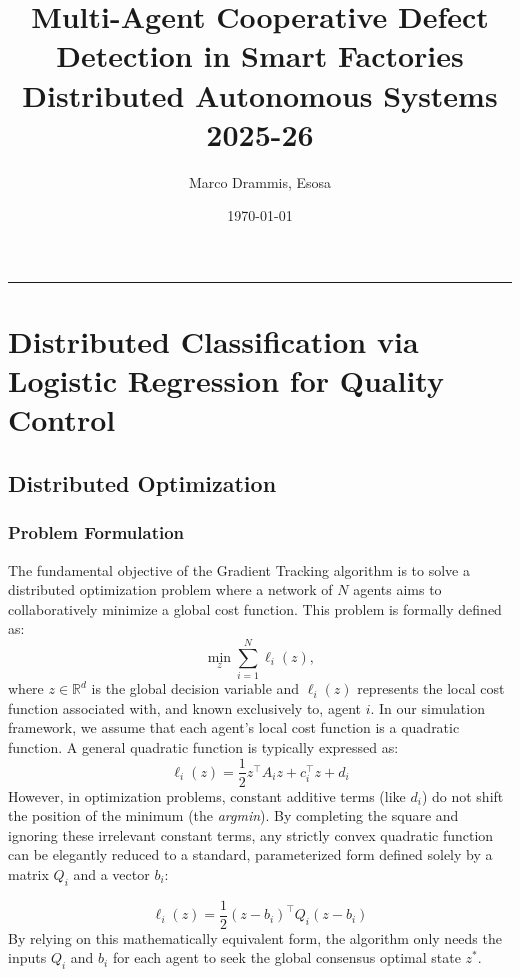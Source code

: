 \documentclass[11pt, a4paper]{article}
\title{\textbf{Multi-Agent Cooperative Defect Detection in Smart Factories}\\ \Large Distributed Autonomous Systems 2025-26}
\author{Marco Drammis, Esosa}
\date{\today}
\begin{document}
\maketitle

\tableofcontents
\vspace{1cm}
\hrule
\vspace{1cm}

\section{Distributed Classification via Logistic Regression for
Quality Control}
\subsection{Distributed Optimization}
\subsubsection{Problem Formulation}
\label{sec:problem_formulation}

The fundamental objective of the Gradient Tracking algorithm is to solve a distributed optimization problem where a network of $N$ agents aims to collaboratively minimize a global cost function. This problem is formally defined as:
\begin{equation}
    \min_z \sum_{i=1}^N \ell_i(z),
    \label{eq:global_min}
\end{equation}
where $z \in \mathbb{R}^d$ is the global decision variable and $\ell_i(z)$ represents the local cost function associated with, and known exclusively to, agent $i$. 
In our simulation framework, we assume that each agent's local cost function is a quadratic function. A general quadratic function is typically expressed as:
\begin{equation}
    \ell_i(z) = \frac{1}{2} z^\top A_i z + c_i^\top z + d_i
\end{equation}
However, in optimization problems, constant additive terms (like $d_i$) do not shift the position of the minimum (the \textit{argmin}). By completing the square and ignoring these irrelevant constant terms, any strictly convex quadratic function can be elegantly reduced to a standard, parameterized form defined solely by a matrix $Q_i$ and a vector $b_i$:

\begin{equation}
    \ell_i(z) = \frac{1}{2} (z - b_i)^\top Q_i (z - b_i)
    \label{eq:local_cost}
\end{equation}
By relying on this mathematically equivalent form, the algorithm only needs the inputs $Q_i$ and $b_i$ for each agent to seek the global consensus optimal state $z^*$.
\end{document}
